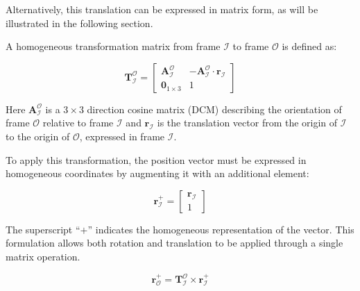 \noindent Alternatively, this translation can be expressed in matrix form, as will be illustrated in the following section.


\noindent A homogeneous transformation matrix from frame $\mathcal{I}$ to frame $\mathcal{O}$ is defined as:

\begin{equation}
    \mathbf{T}_\mathcal{I}^\mathcal{O} =
    \begin{bmatrix}
        \mathbf{A}_\mathcal{I}^\mathcal{O} & -\mathbf{A}_\mathcal{I}^\mathcal{O} \cdot \mathbf{r}_\mathcal{I} \\
        \mathbf{0}_{1 \times 3} & 1
    \end{bmatrix}
\end{equation}

\noindent Here $\mathbf{A}_\mathcal{I}^\mathcal{O}$ is a $3 \times 3$ direction cosine matrix (DCM) describing the orientation of frame $\mathcal{O}$ relative to 
frame $\mathcal{I}$ and $\mathbf{r}_\mathcal{I}$ is the translation vector from the origin of $\mathcal{I}$ to the origin of $\mathcal{O}$, expressed in frame $\mathcal{I}$.
\vspace{0.5cm}

\noindent To apply this transformation, the position vector must be expressed in homogeneous coordinates by augmenting it with an additional element:

\begin{equation}
    \mathbf{r}_\mathcal{I}^+ = 
    \begin{bmatrix}
        \mathbf{r}_\mathcal{I} \\
        1
    \end{bmatrix}
\end{equation}

\noindent The superscript ``$+$'' indicates the homogeneous representation of the vector. This formulation allows both rotation and translation to be applied 
through a single matrix operation.
\vspace{0.5cm}

\begin{equation}
\mathbf{r}_\mathcal{O}^+ = \mathbf{T}_\mathcal{I}^\mathcal{O} \times \mathbf{r}_\mathcal{I}^+
\label{Eq:3.34}
\end{equation}

